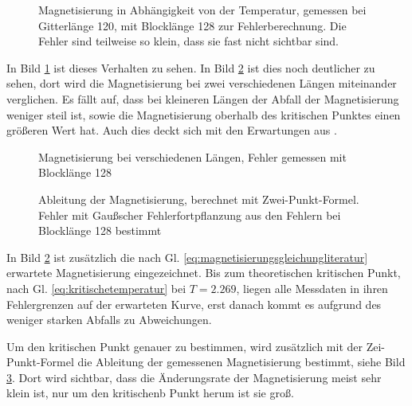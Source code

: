 	
	\begin{figure}[htbp]
		
		\caption[Magnetisierung in Abhängigkeit von der Temperatur]{Magnetisierung in Abhängigkeit von der Temperatur, gemessen bei Gitterlänge 120, mit Blocklänge 128 zur Fehlerberechnung. Die Fehler sind teilweise so klein, dass sie fast nicht sichtbar sind.}
		\label{fig:ergebnismagnetisierung}
	\end{figure}	
	
	In Bild \ref{fig:ergebnismagnetisierung} ist dieses Verhalten zu sehen. In Bild \ref{fig:maglaenge} ist dies noch deutlicher zu sehen, dort wird die Magnetisierung bei zwei verschiedenen Längen miteinander verglichen. Es fällt auf, dass bei kleineren Längen der Abfall der Magnetisierung weniger steil ist, sowie die Magnetisierung oberhalb des kritischen Punktes einen größeren Wert hat. Auch dies deckt sich mit den Erwartungen aus \cite[Abschnitt 2.3.3]{binderheermann}.%
	
	
	\begin{figure}[htbp]
		
		\caption[Magnetisierung bei verschiedenen Längen]{Magnetisierung bei verschiedenen Längen, Fehler gemessen mit Blocklänge 128}
		\label{fig:maglaenge}
	\end{figure}

	\begin{figure}[htbp]
		
		\caption[Ableitung der Magnetisierung]{Ableitung der Magnetisierung, berechnet mit Zwei-Punkt-Formel. Fehler mit Gaußscher Fehlerfortpflanzung aus den Fehlern bei Blocklänge 128 bestimmt}
		\label{fig:ableitung120128}
	\end{figure}
	
	In Bild \ref{fig:maglaenge} ist zusätzlich die nach Gl. \ref{eq:magnetisierungsgleichungliteratur} erwartete Magnetisierung eingezeichnet. Bis zum theoretischen kritischen Punkt, nach Gl. \ref{eq:kritischetemperatur} bei $T=\num{2,269}$, liegen alle Messdaten in ihren Fehlergrenzen auf der erwarteten Kurve, erst danach kommt es aufgrund des weniger starken Abfalls zu Abweichungen.
	
	Um den kritischen Punkt genauer zu bestimmen, wird zusätzlich mit der Zei-Punkt-Formel die Ableitung der gemessenen Magnetisierung bestimmt, siehe Bild \ref{fig:ableitung120128}. Dort wird sichtbar, dass die Änderungsrate der Magnetisierung meist sehr klein ist, nur um den kritischenb Punkt herum ist sie groß.%
	
